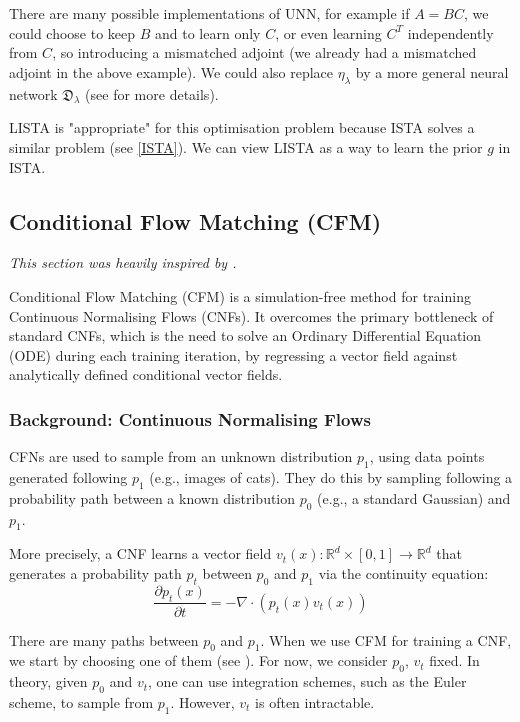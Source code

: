 \documentclass[a4paper,11pt]{article}
\theoremstyle{plain}{\theorembodyfont{\rmfamily}%
\newtheorem{proposition}[theorem]{Proposition}}
\theoremstyle{plain}{\theorembodyfont{\rmfamily}%
\newtheorem{notation}[theorem]{Notation}}
\theoremstyle{plain}{\theorembodyfont{\rmfamily}%
\newtheorem{assumption}[theorem]{Assumption}}
\theoremstyle{plain}{\theorembodyfont{\rmfamily}%
\newtheorem{problem}[theorem]{Problem}}
\theoremstyle{plain}{\theorembodyfont{\rmfamily}%
\newtheorem{example}[theorem]{Example}}
\theoremstyle{plain}{\theorembodyfont{\rmfamily}%
\newtheorem{remark}[theorem]{Remark}}
\theoremstyle{plain}{\theorembodyfont{\rmfamily}%
\newtheorem{definition}[theorem]{Definition}}
\theoremstyle{plain}{\theorembodyfont{\rmfamily}%
\newtheorem{question}[theorem]{Question}}
\numberwithin{equation}{section}
\begin{document}
There are many possible implementations of UNN, for example if $A = BC$, we could choose to keep $B$ and to learn only $C$, or even learning $C^{T}$ independently from $C$, so introducing a mismatched adjoint (we already had a mismatched adjoint in the above example). We could also replace $\eta_{\lambda}$ by a more general neural network $\mathfrak{D}_{\lambda}$ (see \cite{repetti_eusipco} for more details).

\begin{remark}\label{appropriate_meaning}
    LISTA is "appropriate" for this optimisation problem because ISTA solves a similar problem (see \ref{ISTA}). We can view LISTA as a way to learn the prior $g$ in ISTA.
\end{remark}

\subsection{Conditional Flow Matching (CFM)}

\textit{This section was heavily inspired by \cite{gagneux2025avisualdive}.}

Conditional Flow Matching (CFM) \cite{lipman2023flowmatching} is a simulation-free method for training Continuous Normalising Flows (CNFs). It overcomes the primary bottleneck of standard CNFs, which is the need to solve an Ordinary Differential Equation (ODE) during each training iteration, by regressing a vector field against analytically defined conditional vector fields.

\subsubsection{Background: Continuous Normalising Flows}
CFNs are used to sample from an unknown distribution $p_1$, using data points generated following $p_1$ (e.g., images of cats). They do this by sampling following a probability path between a known distribution $p_0$ (e.g., a standard Gaussian) and $p_1$.

More precisely, a CNF learns a vector field $v_t(x): \mathbb{R}^d \times [0, 1] \to \mathbb{R}^d$ that generates a probability path $p_t$ between $p_0$ and $p_1$ via the continuity equation:
\begin{equation}
\frac{\partial p_t(x)}{\partial t} = -\nabla \cdot (p_t(x) v_t(x))
\end{equation}

There are many paths between $p_0$ and $p_1$. When we use CFM for training a CNF, we start by choosing one of them (see ). For now, we consider $p_0$, $v_t$ fixed. In theory, given $p_0$ and $v_t$, one can use integration schemes, such as the Euler scheme, to sample from $p_1$. However, $v_t$ is often intractable.
\end{document}
